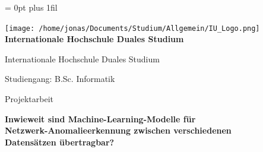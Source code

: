 \documentclass[11pt,a4paper]{article}
\begin{document}
    \makeatletter
    \@flushglue = 0pt plus 1fil
    \makeatother
    \setcounter{page}{1}
    \begin{titlepage}
        \thispagestyle{empty}
        \vspace*{-1cm}

        \begin{center}
            {\texttt{[image: /home/jonas/Documents/Studium/Allgemein/IU\_Logo.png]}}
            {\textbf{\Large Internationale Hochschule Duales Studium}}
        \end{center}

        \vspace{2cm}

        \begin{center}
            {\fontsize{11pt}{13pt}\selectfont Internationale Hochschule Duales Studium}

            \vspace{0.5cm}

            {\fontsize{11pt}{13pt}\selectfont Studiengang: B.Sc. Informatik}
        \end{center}

        \vspace{1cm}

        \begin{center}
            {\fontsize{11pt}{13pt}\selectfont Projektarbeit}
        \end{center}

        \vspace{1.5cm}

        \begin{center}
            {\bfseries\fontsize{14pt}{16pt}\selectfont Inwieweit sind Machine-Learning-Modelle f\"ur\\Netzwerk-Anomalieerkennung zwischen verschiedenen\\Datens\"atzen \"ubertragbar?}
        \end{center}

        \vspace{2cm}


\end{titlepage}
\end{document}
